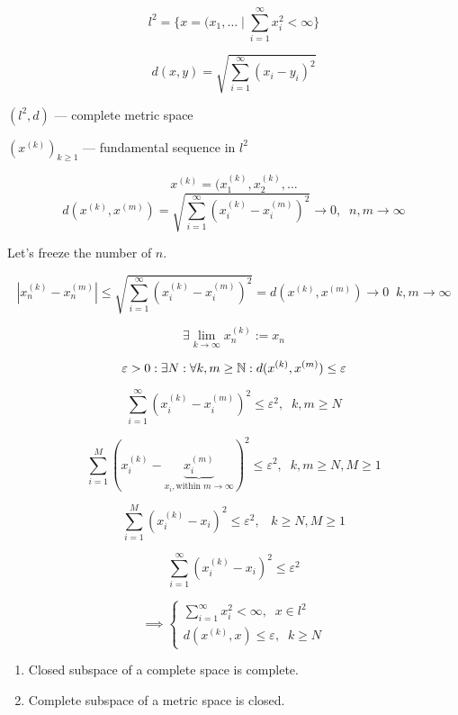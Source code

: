 \begin{example}
  \[ l^2 = \{x = (x_1, \ldots \mid \sum_{i=1}^{\infty} x_i^2 < \infty\}  \] 

  \[ d(x,y) = \sqrt{\sum_{i=1}^{\infty} (x_i - y_i)^2}  \] 

  $(l^2, d)$ --- complete metric space

  $(x^{(k)})_{k \ge 1}$ --- fundamental sequence in $l^2$

  \[ x^{(k)} = (x^{(k)}_1, x^{(k)}_2, \ldots \] 
  \[ d(x^{(k)}, x^{(m)}) = \sqrt{\sum_{i=1}^{\infty} 
  \left( x_i^{(k)} - x_i^{(m)} \right) ^2} \to  0, \;\; n,m \to \infty  \] 

  Let's freeze the number of $n$.

   \[ \left| x^{(k)}_{n} - x^{(m)}_{n} \right| \le \sqrt{\sum_{i=1}^{\infty} \left( x_i^{(k)} - x_{i}^{(m)} \right)^2 } = d(x^{(k)}, x^{(m)}) \to 0\;\;k,m \to  \infty \] 

\[ \exists \lim_{k \to \infty} x^{(k)}_{n} := x_n \] 

\[ \varepsilon > 0 : \exists N : \forall k,m \ge  \mathbb{N} : d(x^{(k)}, x^{(m)}) \le  \varepsilon \] 

\[ \sum_{i=1}^{\infty} \left( x_i^{(k)} - x_i^{(m)} \right) ^2 \le  \varepsilon^2, \;\; k,m \ge  N \] 

\[ \sum_{i=1}^{M} \left( x_i^{(k)}- \underbrace{x_i^{(m)}}_{x_i, \text{within } m \to  \infty} \right) ^2 \le  \varepsilon^2, \;\; k,m \ge  N, M \ge  1 \] 

\[ \sum_{i=1}^{M} \left( x_i^{(k)} - x_i \right) ^2 \le  \varepsilon^2, \;\;\; k \ge  N, M \ge 1 \] 

\[ \sum_{i=1}^{\infty} \left( x_i^{(k)} - x_i  \right) ^2 \le  \varepsilon^2 \] 

\[ \implies \begin{cases}
  \sum_{i=1}^{\infty} x_i^2 < \infty , \;\; x \in  l^2 \\
  d(x^{(k)}, x) \le  \varepsilon, \;\; k \ge N
\end{cases}  \]

  
\end{example}


\begin{corollary}
  \begin{enumerate}
    \item Closed subspace of a complete space is complete.
    \item Complete subspace of a metric space is closed.
  \end{enumerate}
\end{corollary}


